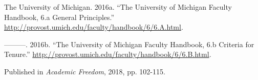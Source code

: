 \documentclass[
  11pt,
  letterpaper,
  DIV=11,
  numbers=noendperiod,
  twoside]{scrartcl}
\newlength{\cslhangindent}
\newenvironment{CSLReferences}[2] %
 {\begin{list}{}{%
  \setlength{\itemindent}{0pt}
  \setlength{\leftmargin}{0pt}
  \setlength{\parsep}{0pt}
  \ifodd #1
   \setlength{\leftmargin}{\cslhangindent}
   \setlength{\itemindent}{-1\cslhangindent}
  \fi
  \setlength{\itemsep}{#2\baselineskip}}}
 {\end{list}}
\begin{document}
\begin{CSLReferences}{1}{0}
The University of Michigan. 2016a. {``The University of Michigan Faculty
Handbook, 6.a General Principles.''}
\url{http://provost.umich.edu/faculty/handbook/6/6.A.html}.

---------. 2016b. {``The University of Michigan Faculty Handbook, 6.b
Criteria for Tenure.''}
\url{http://provost.umich.edu/faculty/handbook/6/6.B.html}.

\end{CSLReferences}



\noindent Published in\emph{
Academic Freedom}, 2018, pp. 102-115.
\end{document}
